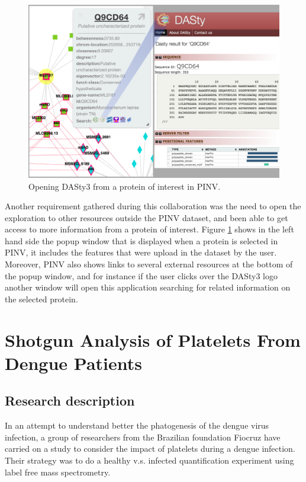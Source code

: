 \begin{figure}
\centering
\includegraphics[width=5in]{figures/pinv2dasty.png}
\caption[Opening DASty3 from a protein of interest in PINV.]{Opening DASty3 from a protein of interest in PINV.
\label{fig:pinv2dasty}}
\end{figure}

Another requirement gathered during this collaboration was the need to open the exploration to other resources outside the PINV dataset, and been able to get access to more information from a protein of interest. Figure \ref{fig:pinv2dasty} shows in the left hand side the popup window that is displayed when a protein is selected in PINV, it includes the features that were upload in the dataset by the user. Moreover, PINV also shows links to several external resources at the bottom of the popup window, and for instance if the user clicks over the DASty3 logo another window will open this application searching for related information on the selected protein.



\section{Shotgun Analysis of Platelets From Dengue Patients}
\label{sec:dengue}
\subsection{Research description}
In an attempt to understand better the phatogenesis of the dengue virus infection, a group of researchers from the Brazilian foundation Fiocruz have carried on a study to consider the impact of platelets during a dengue infection. Their strategy was to do a healthy v.s. infected quantification experiment using label free mass spectrometry.

